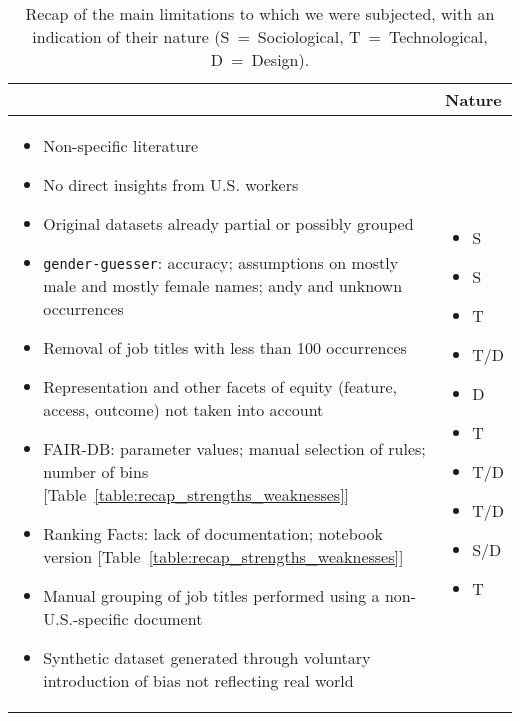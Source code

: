 \begin{table}[t!]
\begin{tabularx}{\columnwidth}{|>{\RaggedRight\arraybackslash}Y>{\centering\arraybackslash}p{1.5cm}|}
\hline
{} & \textbf{Nature}\\
\hline
\begin{itemize}[noitemsep,topsep=0pt,parsep=0pt,partopsep=0pt,leftmargin=*]
\item Non-specific literature
\item No direct insights from U.S. workers
\item Original datasets already partial or possibly grouped
\item \texttt{gender-guesser}: accuracy; assumptions on mostly male and mostly female names; andy and unknown occurrences
\item Removal of job titles with less than 100 occurrences
\item Representation and other facets of equity (feature, access, outcome) not taken into account
\item FAIR-DB: parameter values; manual selection of rules; number of bins [Table~\ref{table:recap_strengths_weaknesses}]
\item Ranking Facts: lack of documentation; notebook version [Table~\ref{table:recap_strengths_weaknesses}]
\item Manual grouping of job titles performed using a non-U.S.-specific document
\item Synthetic dataset generated through voluntary introduction of bias not reflecting real world
\end{itemize} & \begin{itemize}[label={},noitemsep,topsep=0pt,parsep=0pt,partopsep=0pt,leftmargin=*]
\centering
\item S
\item S
\item T
\item T/D\vspace{\baselineskip}
\item D
\item T\vspace{\baselineskip}
\item T/D\vspace{\baselineskip}
\item T/D\vspace{\baselineskip}
\item S/D\vspace{\baselineskip}
\item T
\end{itemize}\\
\hline
\end{tabularx}
\centering
\caption{Recap of the main limitations to which we were subjected, with an indication of their nature (S~=~Sociological, T~=~Technological, D~=~Design).}
\label{table:recap_limitations}
\end{table}

